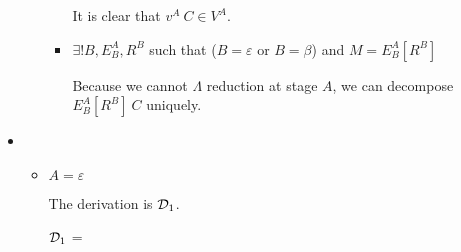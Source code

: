 \begin{itemize}
\begin{itemize}
\begin{itemize}
	      	      	      It is clear that $v^A\ C \in V^A$.
	      	      	      	      	      	      	      	      	      	      	      	      	      	      	      	      	      	      	      	      	      	      	      	      	      	      	      	      	      	      		      	      	      	      	      	      	      	      	      	      	      	      
	      	      	\item $\exists ! B, E^A_B, R^B$ such that ($B = \varepsilon$ or $B = \beta$) and $M = E^A_B[R^B]$
	      	      	      	      	      	      	      	      	      	      	      	      	      	      	      	      	      	      	      	      	      	      	      	      	      	      	      	      	      	      		      	      	      	      	      	      	      	      	      	      	      	      
	      	      	      Because we cannot $\Lambda$ reduction at stage $A$, we can decompose $E^A_B[R^B]\ C$ uniquely.
	      	      \end{itemize}
	      	      	      	      	      	      	      	      	      	      	      	      	      	      	      	      	      	      	      	      		      	      	      	      	      	      	      	      
	      	      	      	      	      	      	      	      	      	      	      	      	      	      	      	      	      	      	      	      		      	      	      	      	      	      	      	      
	      \end{itemize}
	      	      	      	      	      	      	      	      	      	      		      	      	      	      
	\item \TApp
	      	      	      	      	      	      	      	      	      	      		      	      	      	      
	      \begin{itemize}
	      	\item $ A = \varepsilon$
	      	      	      	      	      	      	      	      	      	      	      	      	      	      	      	      	      	      	      	      		      	      	      	      	      	      	      	      
	      	      The derivation is $\mathcal{D}_1$.
	      	      	      	      	      	      	      	      	      	      	      	      	      	      	      	      	      	      	      	      		      	      	      	      	      	      	      	      
	      	      $\mathcal{D}_1$ = 
	      	      { \andalso {}}
	      	      	      	      	      	      	      	      	      	      	      	      	      	      	      	      	      	      	      	      		      	      	      	      	      	      	      	      

\end{itemize}
\end{itemize}
